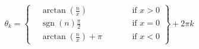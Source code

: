\documentclass[preview]{standalone}
\begin{document}
\begin{align*}
\theta_{k}=\left\{\begin{alignedat}{2}&\! \arctan \left (\frac{n}{x}  \right )      &\qquad& \text{if $x>0$} \\& \operatorname{sgn}\left (n  \right ) \frac{\pi}{2}            &      & \text{if $x=0$} \\&\! \arctan \left (\frac{n}{x}  \right ) +\pi &      & \text{if $x<0$}\end{alignedat}\right\}+2\pi k
\end{align*}
\end{document}
